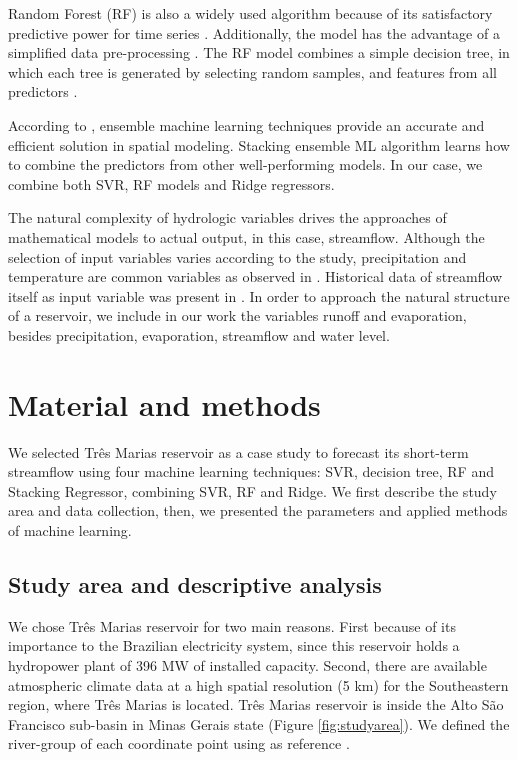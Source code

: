 \documentclass[12pt]{article}
\begin{document}
Random Forest (RF) is also a widely used algorithm because of its satisfactory predictive power for time series \cite{wang}. Additionally, the model has the advantage of a simplified data pre-processing \cite{li}. The RF model combines a simple decision tree, in which each tree is generated by selecting random samples, and features from all predictors \cite{naghibi}.

According to \cite{dou}, ensemble machine learning techniques
provide an accurate and efficient solution in spatial modeling. Stacking ensemble ML algorithm learns how to combine the predictors from other well-performing models. In our case, we combine both SVR, RF models and Ridge regressors.

The natural complexity of hydrologic variables drives the approaches of mathematical models to actual output, in this case, streamflow. Although the selection of input variables varies according to the study, precipitation and temperature are common variables as observed in \cite{kassem2020predicting,essenfelder2020smart,bhatta2019evaluation}. Historical data of streamflow itself as input variable was present in \cite{li}. In order to approach the natural structure of a reservoir, we include in our work the variables runoff and evaporation, besides precipitation, evaporation, streamflow and water level.

\section{Material and methods}
\label{sec:MateriaMethods}

We selected Três Marias reservoir as a case study to forecast its short-term streamflow using four machine learning techniques: SVR, decision tree, RF and Stacking Regressor, combining SVR, RF and Ridge. We first describe the study area and data collection, then, we presented the parameters and applied methods of machine learning.

\subsection{Study area and descriptive analysis}
\label{ssec:StudyAreaDecriptiveAnalysis}

We chose Três Marias reservoir for two main reasons. First because of its importance to the Brazilian electricity system, since this reservoir holds a hydropower plant of 396 MW of installed capacity. Second, there are available atmospheric climate data at a high spatial resolution (5 km) for the Southeastern region, where Três Marias is located. Três Marias reservoir is inside the Alto São Francisco sub-basin in Minas Gerais state (Figure \ref{fig:studyarea}). We defined the river-group of each coordinate point using as reference \cite{fundep}.
\end{document}
